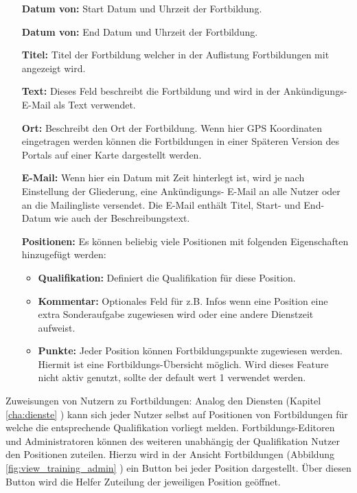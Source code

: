 \begin{itemize}
	\item[\textbf{Datum von:}] Start Datum und Uhrzeit der Fortbildung.
	\item[\textbf{Datum von:}] End Datum und Uhrzeit der Fortbildung.
	\item[\textbf{Titel:}] Titel der Fortbildung welcher in der Auflistung Fortbildungen mit angezeigt wird.
	\item[\textbf{Text:}] Dieses Feld beschreibt die Fortbildung und wird in der Ankündigungs- E-Mail als Text verwendet.
	\item[\textbf{Ort:}] Beschreibt den Ort der Fortbildung. Wenn hier GPS Koordinaten eingetragen werden können die Fortbildungen in einer Späteren Version des Portals auf einer Karte dargestellt werden.
	\item[\textbf{E-Mail:}] Wenn hier ein Datum mit Zeit hinterlegt ist, wird je nach Einstellung der Gliederung, eine Ankündigungs- E-Mail an alle Nutzer oder an die Mailingliste versendet. Die E-Mail enthält Titel, Start- und End-Datum wie auch der Beschreibungstext.
	\item[\textbf{Positionen:}] Es können beliebig viele Positionen mit folgenden Eigenschaften hinzugefügt werden:
	\begin{itemize}
		\item \textbf{Qualifikation:} Definiert die Qualifikation für diese Position.
		\item \textbf{Kommentar:} Optionales Feld für z.B. Infos wenn eine Position eine extra Sonderaufgabe zugewiesen wird oder eine andere Dienstzeit aufweist.
		\item \textbf{Punkte:} Jeder Position können Fortbildungspunkte zugewiesen werden. Hiermit ist eine Fortbildungs-Übersicht möglich. Wird dieses Feature nicht aktiv genutzt, sollte der default wert 1 verwendet werden.
	\end{itemize}
\end{itemize}

\noindent Zuweisungen von Nutzern zu Fortbildungen:
Analog den Diensten (Kapitel \ref{cha:dienste} ) kann sich jeder Nutzer selbst auf Positionen von Fortbildungen für welche die entsprechende Qualifikation vorliegt melden. Fortbildungs-Editoren und Administratoren können des weiteren unabhängig der Qualifikation Nutzer den Positionen zuteilen. Hierzu wird in der Ansicht Fortbildungen (Abbildung \ref{fig:view_training_admin} \textit{}) ein Button bei jeder Position dargestellt. Über diesen Button wird die Helfer Zuteilung der jeweiligen Position geöffnet.

